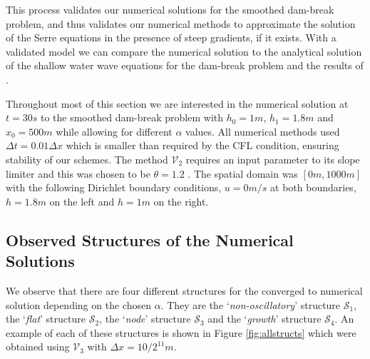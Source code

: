 \documentclass[times]{elsarticle}
\begin{document}
This process validates our numerical solutions for the smoothed dam-break problem, and thus validates our numerical methods to approximate the solution of the Serre equations in the presence of steep gradients, if it exists. With a validated model we can compare the numerical solution to the analytical solution of the shallow water wave equations for the dam-break problem and the results of \citet{El-etal-2006}.

Throughout most of this section we are interested in the numerical solution at $t=30s$ to the smoothed dam-break problem with $h_0 = 1m$, $h_1 = 1.8m$ and $x_0 = 500m$ while allowing for different $\alpha$ values. All numerical methods used $\Delta t = 0.01 \Delta x$ which is smaller than required by the CFL condition, ensuring stability of our schemes. The method $\mathcal{V}_2$ requires an input parameter to its slope limiter and this was chosen to be $\theta = 1.2$ \cite{Zoppou-etal-2017}. The spatial domain was $[0m,1000m]$ with the following Dirichlet boundary conditions, $u = 0m/s$ at both boundaries, $h =1.8m$ on the left and $h =1m$ on the right.

\subsection{Observed Structures of the Numerical Solutions}
\label{subsec:observedstructs}
We observe that there are four different structures for the converged to numerical solution depending on the chosen $\alpha$. They are the `\textit{non-oscillatory}' structure $\mathcal{S}_1$, the `\textit{flat}' structure $\mathcal{S}_2$, the `\textit{node}' structure $\mathcal{S}_3$ and the `\textit{growth}' structure $\mathcal{S}_4$. An example of each of these structures is shown in Figure \ref{fig:allstructs} which were obtained using $\mathcal{V}_3$ with $\Delta x = 10/2^{11}m$.
\end{document}
